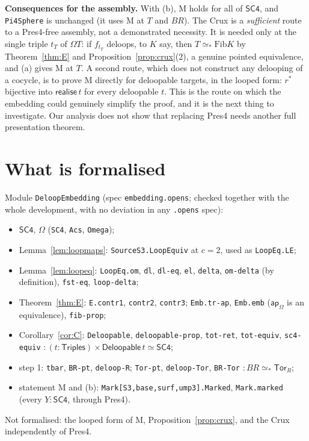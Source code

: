 \documentclass[11pt]{amsart}
\theoremstyle{definition}
\theoremstyle{remark}
\newcommand{\Om}{\Omega}
\newcommand{\code}[1]{\texttt{#1}}
\newcommand{\ap}{\mathsf{ap}}
\newcommand{\Fib}{\mathrm{Fib}}
\newcommand{\Tor}{\mathsf{Tor}}
\newcommand{\SCf}{\mathsf{SC4}}
\newcommand{\Tri}{\mathsf{Triples}}
\newcommand{\Del}{\mathsf{Deloopable}}
\newcommand{\real}{\mathsf{realise}}
\newcommand{\pteq}{\simeq_*}
\begin{document}
\noindent\textbf{Consequences for the assembly.} With (b), M holds for all of
$\SCf$, and \code{Pi4Sphere} is unchanged (it uses M at $T$ and $BR$). The Crux is
a \emph{sufficient} route to a Pres4-free assembly, not a demonstrated
necessity. It is needed only at the single triple $t_T$ of $\Om T$: if
$f_{t_T}$ deloops, to $K$ say, then $T\pteq\Fib K$ by Theorem~\ref{thm:E} and
Proposition~\ref{prop:crux}(2), a genuine pointed equivalence, and (a) gives M at $T$. A second route, which
does not construct any delooping of a cocycle, is to prove M directly for
deloopable targets, in the looped form: $r^*$ bijective into $\real\,t$ for every
deloopable $t$. This is the route on which the embedding could genuinely
simplify the proof, and it is the next thing to investigate. Our analysis
does not show that replacing Pres4 needs another full presentation theorem.

\section{What is formalised}

Module \code{DeloopEmbedding} (spec \code{embedding.opens}; checked together
with the whole development, with no deviation in any \code{.opens} spec):
\begin{itemize}
\item $\SCf$, $\Om$ (\code{SC4}, \code{Acs}, \code{Omega});
\item Lemma~\ref{lem:loopmaps}: \code{SourceS3.LoopEquiv} at $c=2$, used as \code{LoopEq.LE};
\item Lemma~\ref{lem:loopeq}: \code{LoopEq.om}, \code{dl}, \code{dl-eq},
  \code{el}, \code{delta}, \code{om-delta} (by definition), \code{fst-eq},
  \code{loop-delta};
\item Theorem~\ref{thm:E}: \code{E.contr1}, \code{contr2}, \code{contr3};
  \code{Emb.tr-ap}, \code{Emb.emb} ($\ap_\Om$ is an equivalence),
  \code{fib-prop};
\item Corollary~\ref{cor:C}: \code{Deloopable}, \code{deloopable-prop},
  \code{tot-ret}, \code{tot-equiv}, \code{sc4-equiv} $:(t:\Tri)\times\Del\,t\simeq\SCf$;
\item step 1: \code{tbar}, \code{BR-pt}, \code{deloop-R}; \code{Tor-pt},
  \code{deloop-Tor}, \code{BR-Tor} $:BR\pteq\Tor_R$;
\item statement M and (b): \code{Mark[S3,base,surf,ump3].Marked},
  \code{Mark.marked} (every $Y:\SCf$, through Pres4).
\end{itemize}
Not formalised: the looped form of M, Proposition~\ref{prop:crux}, and the Crux
independently of Pres4.
\end{document}
